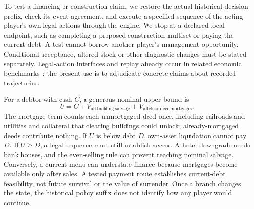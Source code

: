 To test a financing or construction claim, we restore the actual historical decision prefix, check its event agreement, and execute a specified sequence of the acting player's own legal actions through the engine. We stop at a declared local endpoint, such as completing a proposed construction multiset or paying the current debt. A test cannot borrow another player's management opportunity. Conditional acceptance, altered stock or other diagnostic changes must be stated separately. Legal-action interfaces and replay already occur in related economic benchmarks~\cite{wu2026agentmonopoly,zhang2026dece}; the present use is to adjudicate concrete claims about recorded trajectories.

For a debtor with cash $C$, a generous nominal upper bound is
\begin{equation}
 U=C+V_{\mathrm{all\ building\ salvage}}
       +V_{\mathrm{all\ clear\ deed\ mortgages}}.
 \label{eq:sol-upper}
\end{equation}
The mortgage term counts each unmortgaged deed once, including railroads and utilities and collateral that clearing buildings could unlock; already-mortgaged deeds contribute nothing. If $U$ is below debt $D$, own-asset liquidation cannot pay $D$. If $U\geq D$, a legal sequence must still establish access. A hotel downgrade needs bank houses, and the even-selling rule can prevent reaching nominal salvage. Conversely, a current menu can understate finance because mortgages become available only after sales. A tested payment route establishes current-debt feasibility, not future survival or the value of surrender. Once a branch changes the state, the historical policy suffix does not identify how any player would continue.

